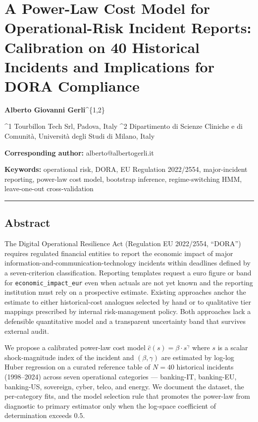 \documentclass[
]{article}
\author{}
\date{}
\begin{document}
\section{A Power-Law Cost Model for Operational-Risk Incident Reports:
Calibration on 40 Historical Incidents and Implications for DORA
Compliance}\label{a-power-law-cost-model-for-operational-risk-incident-reports-calibration-on-40-historical-incidents-and-implications-for-dora-compliance}

\textbf{Alberto Giovanni Gerli}\^{}\{1,2\}

\^{}1 Tourbillon Tech Srl, Padova, Italy \^{}2 Dipartimento di Scienze
Cliniche e di Comunità, Università degli Studi di Milano, Italy

\textbf{Corresponding author:} alberto@albertogerli.it

\textbf{Keywords:} operational risk, DORA, EU Regulation 2022/2554,
major-incident reporting, power-law cost model, bootstrap inference,
regime-switching HMM, leave-one-out cross-validation

\begin{center}\rule{0.5\linewidth}{0.5pt}\end{center}

\subsection{Abstract}\label{abstract}

The Digital Operational Resilience Act (Regulation EU 2022/2554,
``DORA'') requires regulated financial entities to report the economic
impact of major information-and-communication-technology incidents
within deadlines defined by a seven-criterion classification. Reporting
templates request a euro figure or band for
\texttt{economic\_impact\_eur} even when actuals are not yet known and
the reporting institution must rely on a prospective estimate. Existing
approaches anchor the estimate to either historical-cost analogues
selected by hand or to qualitative tier mappings prescribed by internal
risk-management policy. Both approaches lack a defensible quantitative
model and a transparent uncertainty band that survives external audit.

We propose a calibrated power-law cost model
\(\hat{c}(s) = \beta \cdot s^\gamma\) where \(s\) is a scalar
shock-magnitude index of the incident and \((\beta, \gamma)\) are
estimated by log-log Huber regression on a curated reference table of
\(N=40\) historical incidents (1998--2024) across seven operational
categories --- banking-IT, banking-EU, banking-US, sovereign, cyber,
telco, and energy. We document the dataset, the per-category fits, and
the model selection rule that promotes the power-law from diagnostic to
primary estimator only when the log-space coefficient of determination
exceeds \(0.5\).
\end{document}
